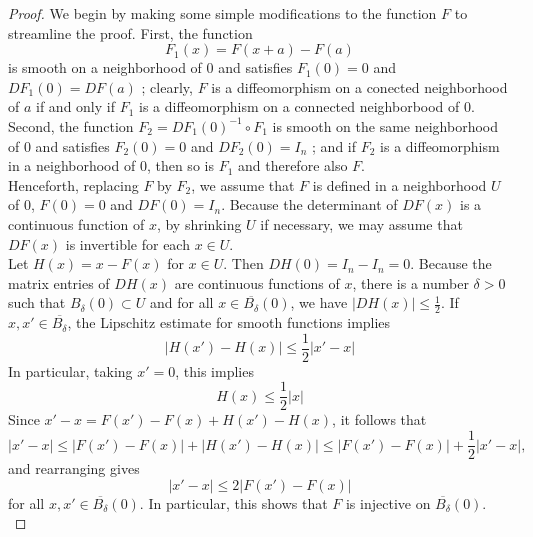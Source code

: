 \documentclass[reqno]{amsart}
\theoremstyle{plain}%
\theoremstyle{definition}
\theoremstyle{remark}
\begin{document}
        \begin{proof}
        We begin by making some simple modifications to the function $F$ to
        streamline the proof. First, the function
        \[
        F_1 (x) = F(x+a)-F(a)
        \] 
        is smooth on a neighborhood of $0$ and satisfies $F_1(0) = 0$ and
        $DF_1 (0) = DF(a)$ ; clearly, $F$ is a diffeomorphism on a conected
        neighborhood of $a$ if and only if $F_1$ is a diffeomorphism on a connected
        neighborbood of $0$. Second, the function $F_2 = 
        DF_1(0)^{-1} \circ F_1$ is smooth on the same neighborhood of $0$ and
        satisfies $F_2(0) = 0$ and $DF_2(0) = I_n$ ; and if $F_2$ is
        a diffeomorphism in a neighborhood of $0$, then so is $F_1$ and therefore
        also $F$.\\
        Henceforth, replacing $F$ by $F_2$, we assume that $F$ is defined in
        a neighborhood $U$ of $0$, $F(0)=0$ and $DF(0)=I_n$. Because the
        determinant of $DF(x)$ is a continuous function of $x$, by shrinking $U$ if
        necessary, we may assume that $DF(x)$ is invertible for each $x \in U$.\\
        Let $H(x) = x - F(x)$ for $x \in U$. Then $DH(0) = I_n - I_n = 0$.
        Because the matrix entries of $DH(x)$ are continuous functions of $x$,
        there is a number $\delta > 0$ such that $B_{\delta}(0) \subset U$ and for
        all $x \in \overline{B_{\delta}}(0)$, we have $\left| DH(x) \right| \le
        \frac{1}{2}$. If $x, x' \in \overline{B_{\delta}}$, the Lipschitz estimate
        for smooth functions implies
        \[
            \left| H(x') - H(x)  \right| \le \frac{1}{2} \left| x' -x \right|
            \tag{$\alpha$} \label{eq:inverse-function-thm-c15}
        \] 
        In particular, taking $x' =0$, this implies
        \[
            H(x) \le \frac{1}{2} \left| x \right| \tag{$\omega
            $}\label{eq:inverse-function-thm-c16}
        \] 
        Since $x' - x = F(x') - F(x) + H(x') - H(x)$, it follows that
        \[
        \left| x' - x \right| \le \left| F(x')- F(x) \right| +
        \left| H(x') - H(x) \right| \le 
        \left| F(x') - F(x) \right| +\frac{1}{2} \left| x' -x \right| ,
        \] 
        and rearranging gives
        \[
            \left| x' -x \right| \le 2 \left| F(x') - F(x) \right|
            \tag{$\gamma$}\label{eq:inverse-function-thm-c17}
        \] 
        for all $x,x' \in \overline{B_{\delta}}(0)$. In particular, this shows that
        $F$ is injective on $\overline{B_{\delta}}(0)$.\\

\end{proof}
\end{document}
